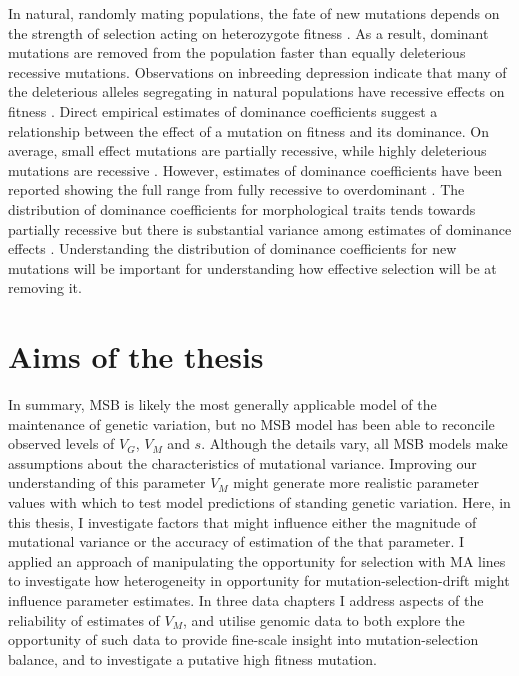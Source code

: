 In natural, randomly mating populations, the fate of new mutations depends on the strength of selection acting on heterozygote fitness \citep{Simm77}. As a result, dominant mutations are removed from the population faster than equally deleterious recessive mutations. Observations on inbreeding depression indicate that many of the deleterious alleles segregating in natural populations have recessive effects on fitness \citep{Char87}. Direct empirical estimates of dominance coefficients suggest a relationship between the effect of a mutation on fitness and its dominance. On average, small effect mutations are partially recessive, while highly deleterious mutations are recessive \citep{Caba97, Hall09, Agra11}. However, estimates of dominance coefficients have been reported showing the full range from fully recessive to overdominant \citep{Houl97, Hall09}. The distribution of dominance coefficients for morphological traits tends towards partially recessive but there is substantial variance among estimates of dominance effects \citep{Sant92, Lope93}. Understanding the distribution of dominance coefficients for new mutations will be important for understanding how effective selection will be at removing it. \par

\section{Aims of the thesis}
In summary, MSB is likely the most generally applicable model of the maintenance of genetic variation, but no MSB model has been able to reconcile observed levels of $V_G$, $V_M$ and $s$. Although the details vary, all MSB models make assumptions about the characteristics of mutational variance. Improving our understanding of this parameter $V_M$ might generate more realistic parameter values with which to test model predictions of standing genetic variation. Here, in this thesis, I investigate factors that might influence either the magnitude of mutational variance or the accuracy of estimation of the that parameter. I applied an approach of manipulating the opportunity for selection with MA lines to investigate how heterogeneity in opportunity for mutation-selection-drift might influence parameter estimates. In three data chapters I address aspects of the reliability of estimates of $V_M$, and utilise genomic data to both explore the opportunity of such data to provide fine-scale insight into mutation-selection balance, and to investigate a putative high fitness mutation.\par

